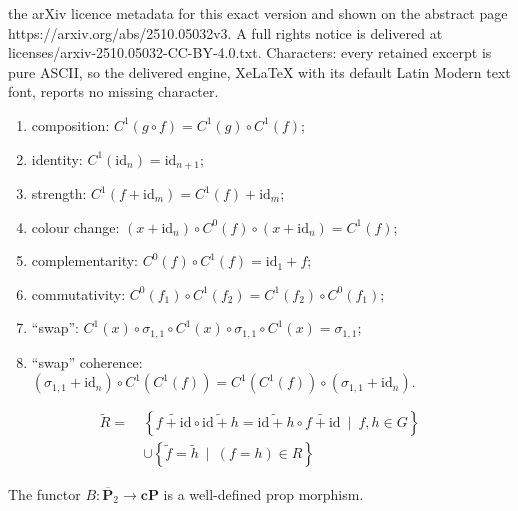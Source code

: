 \documentclass[10pt,a4paper]{amsart}
\newcommand{\alt}{~\mid~}
\newcommand{\ccat}[1]{\mathbf{c #1}}
\newcommand{\iid}{\mathrm{id}}
\newcommand{\ovl}[1]{\overline{#1}}
\newcommand{\tcat}[1]{\mathbf{\ovl{#1}}_2}
\begin{document}
the arXiv licence metadata for this exact version and shown on the abstract page https://arxiv.org/abs/2510.05032v3. A full rights notice is delivered at licenses/arxiv-2510.05032-CC-BY-4.0.txt. Characters: every retained excerpt is pure ASCII, so the delivered engine, XeLaTeX with its default Latin Modern text font, reports no missing character.
	\begin{enumerate}[(\alph*)]
		\item\label{cprop:composition} composition:
			$C^1(g \circ f) = C^1(g) \circ C^1(f)$;
		\item\label{cprop:identity} identity:
			$C^1(\iid_n) = \iid_{n+1}$;
		\item\label{cprop:strength} strength:
			$C^1(f + \iid_m) = C^1(f) + \iid_m$;
		\item\label{cprop:colour} colour change:
			$(x + \iid_n) \circ C^0(f) \circ (x + \iid_n) = C^1(f)$;
		\item\label{cprop:complementarity} complementarity:
			$C^0(f) \circ C^1(f) = \iid_1 + f$;
		\item\label{cprop:commutativity} commutativity:
			$C^0(f_1) \circ C^1(f_2) = C^1(f_2) \circ C^0(f_1)$;
		\item\label{cprop:swap} ``swap'':
			$C^1(x) \circ \sigma_{1,1} \circ C^1(x) \circ \sigma_{1,1} \circ C^1(x)
			= \sigma_{1,1}$;
		\item\label{cprop:swapcoh} ``swap'' coherence:
			$(\sigma_{1,1} + \iid_n) \circ C^1(C^1(f)) = C^1(C^1(f))
			\circ (\sigma_{1,1} + \iid_n)$.
	\end{enumerate}

	\begin{align}
		\label{eq:mon-tensor}
		\widetilde R =~&
		\left\{ \widetilde{f + \iid} \circ \widetilde{\iid + h} = \widetilde{\iid + h} \circ
		\widetilde{f + \iid} \alt f,h \in G \right\} \\
		\label{eq:base-rel}
		&\cup
		\left\{ \widetilde f = \widetilde h \alt (f = h) \in R \right\}
	\end{align}

\begin{lemma}\label{lem:b-def}
	The functor $B \colon \tcat P \to \ccat P$ is a well-defined prop morphism.
\end{lemma}
\end{document}
